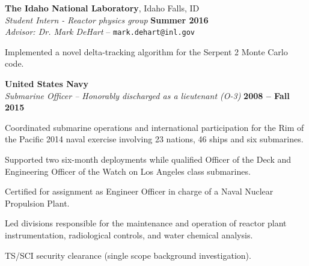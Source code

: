 \documentclass[margin,line]{resume}
\begin{document}
\begin{resume}
    \textbf{The Idaho National Laboratory}, Idaho Falls, ID \\
                \textsl{Student Intern - Reactor physics group} \hfill
                \textbf{Summer 2016}\\
                \textsl{Advisor: Dr. Mark DeHart} --
                \verb`mark.dehart@inl.gov`
                \begin{list2}
                \item[] Implemented a novel delta-tracking algorithm for the Serpent 2 Monte Carlo code.
                \end{list2}
    \textbf{United States Navy} \\
    \textsl{Submarine Officer -- Honorably discharged as a lieutenant (O-3)} \hfill \textbf{2008 -- Fall 2015}
    \\\vspace{-3mm}
    \begin{list2}
    \item Coordinated submarine operations and international
      participation for the Rim of the Pacific 2014 naval exercise
      involving 23 nations, 46 ships and six submarines.
    \item Supported two six-month deployments while qualified Officer
      of the Deck and Engineering Officer of the Watch on Los Angeles class submarines.
    \item Certified for assignment as Engineer Officer in charge of a Naval Nuclear Propulsion Plant.
    \item Led divisions responsible for the maintenance and operation of reactor plant instrumentation, radiological controls, and water chemical analysis.
      \item TS/SCI security clearance (single scope background investigation).
          \end{list2}
                

\end{resume}
\end{document}
